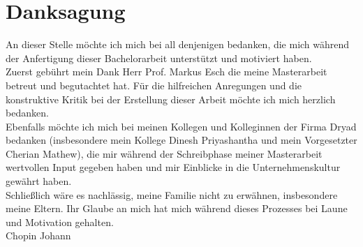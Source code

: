 
\bigskip

\begingroup
\let\clearpage\relax
\let\cleardoublepage\relax
\let\cleardoublepage\relax
\chapter*{Danksagung}
An dieser Stelle möchte ich mich bei all denjenigen bedanken, die mich während der Anfertigung dieser Bachelorarbeit unterstützt und motiviert haben.\\

Zuerst gebührt mein Dank Herr Prof. Markus Esch die meine Masterarbeit betreut und begutachtet hat. Für die hilfreichen Anregungen und die konstruktive Kritik bei der Erstellung dieser Arbeit möchte ich mich herzlich bedanken.\\

Ebenfalls möchte ich mich bei meinen Kollegen und Kolleginnen der Firma Dryad bedanken (insbesondere mein Kollege Dinesh Priyashantha und mein Vorgesetzter Cherian Mathew), die mir während der Schreibphase meiner Masterarbeit wertvollen Input gegeben haben und mir Einblicke in die Unternehmenskultur gewährt haben.\\

Schließlich wäre es nachlässig, meine Familie nicht zu erwähnen, insbesondere meine Eltern. Ihr Glaube an mich hat mich während dieses Prozesses bei Laune und Motivation gehalten.\\

Chopin Johann
\endgroup

